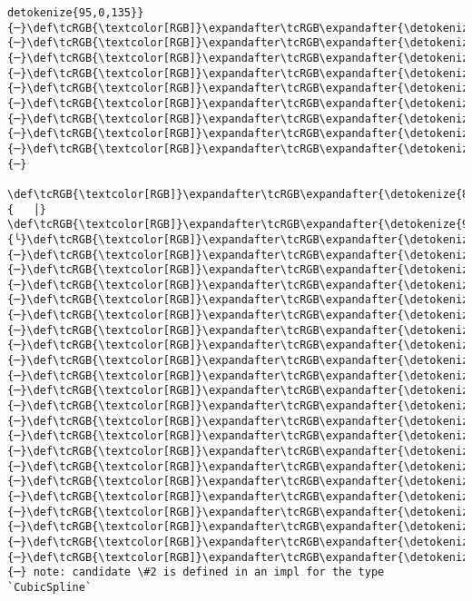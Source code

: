 \documentclass[11pt]{article}
\begin{document}
\begin{Verbatim}[commandchars=\\\{\}, frame=single, framerule=2mm, rulecolor=\color{outerrorbackground}]
detokenize{95,0,135}}{─}\def\tcRGB{\textcolor[RGB]}\expandafter\tcRGB\expandafter{\detokenize{95,0,135}}{─}\def\tcRGB{\textcolor[RGB]}\expandafter\tcRGB\expandafter{\detokenize{95,0,135}}{─}\def\tcRGB{\textcolor[RGB]}\expandafter\tcRGB\expandafter{\detokenize{95,0,135}}{─}\def\tcRGB{\textcolor[RGB]}\expandafter\tcRGB\expandafter{\detokenize{95,0,135}}{─}\def\tcRGB{\textcolor[RGB]}\expandafter\tcRGB\expandafter{\detokenize{95,0,135}}{─}\def\tcRGB{\textcolor[RGB]}\expandafter\tcRGB\expandafter{\detokenize{95,0,135}}{─}\def\tcRGB{\textcolor[RGB]}\expandafter\tcRGB\expandafter{\detokenize{95,0,135}}{─}\def\tcRGB{\textcolor[RGB]}\expandafter\tcRGB\expandafter{\detokenize{95,0,135}}{─}\def\tcRGB{\textcolor[RGB]}\expandafter\tcRGB\expandafter{\detokenize{95,0,135}}{─}  
 \def\tcRGB{\textcolor[RGB]}\expandafter\tcRGB\expandafter{\detokenize{88,88,88}}{   │}                          \def\tcRGB{\textcolor[RGB]}\expandafter\tcRGB\expandafter{\detokenize{95,0,135}}{╰}\def\tcRGB{\textcolor[RGB]}\expandafter\tcRGB\expandafter{\detokenize{95,0,135}}{─}\def\tcRGB{\textcolor[RGB]}\expandafter\tcRGB\expandafter{\detokenize{95,0,135}}{─}\def\tcRGB{\textcolor[RGB]}\expandafter\tcRGB\expandafter{\detokenize{95,0,135}}{─}\def\tcRGB{\textcolor[RGB]}\expandafter\tcRGB\expandafter{\detokenize{95,0,135}}{─}\def\tcRGB{\textcolor[RGB]}\expandafter\tcRGB\expandafter{\detokenize{95,0,135}}{─}\def\tcRGB{\textcolor[RGB]}\expandafter\tcRGB\expandafter{\detokenize{95,0,135}}{─}\def\tcRGB{\textcolor[RGB]}\expandafter\tcRGB\expandafter{\detokenize{95,0,135}}{─}\def\tcRGB{\textcolor[RGB]}\expandafter\tcRGB\expandafter{\detokenize{95,0,135}}{─}\def\tcRGB{\textcolor[RGB]}\expandafter\tcRGB\expandafter{\detokenize{95,0,135}}{─}\def\tcRGB{\textcolor[RGB]}\expandafter\tcRGB\expandafter{\detokenize{95,0,135}}{─}\def\tcRGB{\textcolor[RGB]}\expandafter\tcRGB\expandafter{\detokenize{95,0,135}}{─}\def\tcRGB{\textcolor[RGB]}\expandafter\tcRGB\expandafter{\detokenize{95,0,135}}{─}\def\tcRGB{\textcolor[RGB]}\expandafter\tcRGB\expandafter{\detokenize{95,0,135}}{─}\def\tcRGB{\textcolor[RGB]}\expandafter\tcRGB\expandafter{\detokenize{95,0,135}}{─}\def\tcRGB{\textcolor[RGB]}\expandafter\tcRGB\expandafter{\detokenize{95,0,135}}{─}\def\tcRGB{\textcolor[RGB]}\expandafter\tcRGB\expandafter{\detokenize{95,0,135}}{─}\def\tcRGB{\textcolor[RGB]}\expandafter\tcRGB\expandafter{\detokenize{95,0,135}}{─}\def\tcRGB{\textcolor[RGB]}\expandafter\tcRGB\expandafter{\detokenize{95,0,135}}{─}\def\tcRGB{\textcolor[RGB]}\expandafter\tcRGB\expandafter{\detokenize{95,0,135}}{─}\def\tcRGB{\textcolor[RGB]}\expandafter\tcRGB\expandafter{\detokenize{95,0,135}}{─}\def\tcRGB{\textcolor[RGB]}\expandafter\tcRGB\expandafter{\detokenize{95,0,135}}{─}\def\tcRGB{\textcolor[RGB]}\expandafter\tcRGB\expandafter{\detokenize{95,0,135}}{─} note: candidate \#2 is defined in an impl for the type `CubicSpline`

\end{Verbatim}
\end{document}
